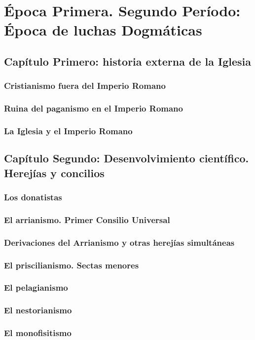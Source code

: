 \raggedbottom{} \documentclass[12pt, a4paper]{book}
\begin{document}
\part{Época Primera. Segundo Período: Época de luchas Dogmáticas}
\chapter{Capítulo Primero: historia externa de la Iglesia}
\section{Cristianismo fuera del Imperio Romano}
\section{Ruina del paganismo en el Imperio Romano}
\section{La Iglesia y el Imperio Romano}
\chapter{Capítulo Segundo: Desenvolvimiento científico. Herejías y concilios}
\section{Los donatistas}
\section{El arrianismo. Primer Consilio Universal}
\section{Derivaciones del Arrianismo y otras herejías simultáneas}
\section{El priscilianismo. Sectas menores}
\section{El pelagianismo}
\section{El nestorianismo}
\section{El monofisitismo}
\end{document}
